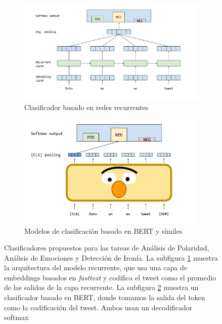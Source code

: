 \begin{figure}
    \centering
    \begin{subfigure}[t]{\textwidth}
        \centering
        \includegraphics[width=\textwidth]{img/03/recurrent_classifier.pdf}
        \caption{Clasificador basado en redes recurrentes}
        \label{subfig:rnn_classifier}
    \end{subfigure}
    \begin{subfigure}[t]{\textwidth}
        \centering
        \includegraphics[width=\textwidth]{img/03/bert_classifier.pdf}
        \caption{Modelos de clasificación basado en BERT y símiles}
        \label{subfig:bert_classifier}
    \end{subfigure}

    \caption{Clasificadores propuestos para las tareas de Análisis de Polaridad, Análisis de Emociones y Detección de Ironía. La subfigura \ref{subfig:rnn_classifier} muestra la arquitectura del modelo recurrente, que usa una capa de embeddings basados en \emph{fasttext} y codifica el tweet como el promedio de las salidas de la capa recurrente. La subfigura \ref{subfig:bert_classifier} muestra un clasificador basado en BERT, donde tomamos la salida del token \clstok{} como la codificación del tweet. Ambos usan un decodificador softmax}
    \label{fig:03_classifiers}
\end{figure}


